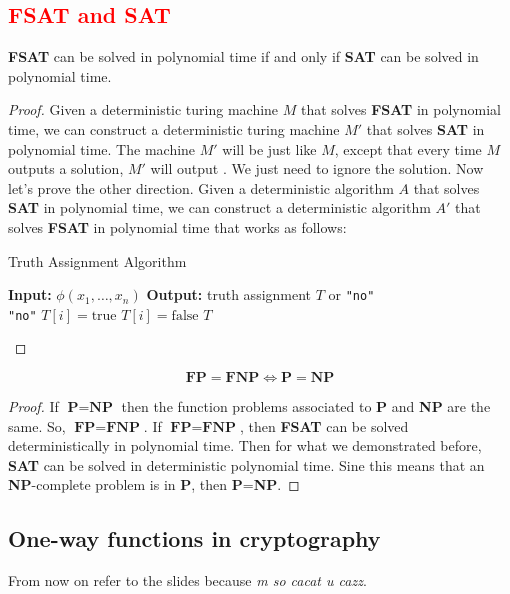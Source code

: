 \newpage
\subsection{\textcolor{red}{FSAT and SAT}}
\begin{defbox}[\textcolor{red}{Proposition (Relation between FSAT and SAT)}]
    \textbf{FSAT} can be solved in polynomial time if and only if \textbf{SAT} can be solved in polynomial time.
\end{defbox}
\begin{proof}
Given a deterministic turing machine $M$ that solves \textbf{FSAT} in polynomial time, we can construct a deterministic turing machine $M'$ that solves \textbf{SAT} in polynomial time. The machine $M'$ will be just like $M$, except that every time $M$ outputs a solution, $M'$ will output . We just need to ignore the solution. Now let's prove the other direction. Given a deterministic algorithm $A$ that solves \textbf{SAT} in polynomial time, we can construct a deterministic algorithm $A'$ that solves \textbf{FSAT} in polynomial time that works as follows:

\begin{algorithm}
\caption{Truth Assignment Algorithm}
\begin{algorithmic}[1]
\State \textbf{Input:} $\phi(x_1, \ldots, x_n)$
\State \textbf{Output:} truth assignment $T$ or \texttt{"no"}
\\
    \State \Return \texttt{"no"}
\EndIf
{}
        \State $T[i] = \text{true}$
    \Else
        \State $T[i] = \text{false}$
    \EndIf
\EndFor
\State \Return $T$
\end{algorithmic}
\end{algorithm}
\end{proof}
\begin{defbox}[Theorem]
    $$\textbf{FP}=\textbf{FNP} \iff \textbf{P}=\textbf{NP}$$
\end{defbox}
\begin{proof}
    If $\textbf{P}=\textbf{NP}$ then the function problems associated to \textbf{P} and \textbf{NP} are the same. So, $\textbf{FP}=\textbf{FNP}$.
    If $\textbf{FP}=\textbf{FNP}$, then \textbf{FSAT} can be solved deterministically in polynomial time. Then for what we demonstrated before, \textbf{SAT} can be solved in deterministic polynomial time. Sine this means that an \textbf{NP}-complete problem is in \textbf{P}, then \textbf{P}=\textbf{NP}. 
\end{proof}

\newpage
\subsection{One-way functions in cryptography}
From now on refer to the slides because \textit{m so cacat u cazz}.

